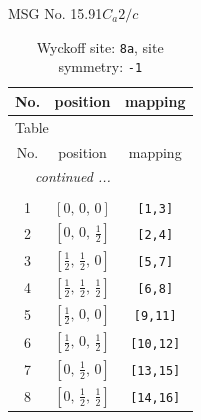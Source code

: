 \documentclass[fleqn,8pt]{jsarticle}
\begin{document}
\setcounter{MaxMatrixCols}{32}

\renewcommand{\tablename}{Table~}
\renewcommand{\figurename}{Figure~}
\begin{center}
\LARGE
MSG No. 15.91\quad$C_{a}2/c$
\end{center}
\renewcommand{\arraystretch}{1.2}
\begin{longtable}{ccc}
\caption{Wyckoff site: {\tt 8a}, site symmetry: {\tt -1}}
 \\
 \hline \hline
No. & position & mapping \\ \hline \endfirsthead

\multicolumn{2}{l}{\tablename\ \thetable{}} \\
 \hline \hline
No. & position & mapping \\ \hline \endhead

 \hline \hline
\multicolumn{2}{r}{\footnotesize\it continued ...} \\ \endfoot

 \hline \hline
\multicolumn{2}{r}{} \\ \endlastfoot

1 & $\left[ 0,\, 0,\, 0 \right]$ & {\tt [1,3]} \\ \hline
2 & $\left[ 0,\, 0,\, \frac{1}{2} \right]$ & {\tt [2,4]} \\ \hline
3 & $\left[ \frac{1}{2},\, \frac{1}{2},\, 0 \right]$ & {\tt [5,7]} \\ \hline
4 & $\left[ \frac{1}{2},\, \frac{1}{2},\, \frac{1}{2} \right]$ & {\tt [6,8]} \\ \hline
5 & $\left[ \frac{1}{2},\, 0,\, 0 \right]$ & {\tt [9,11]} \\ \hline
6 & $\left[ \frac{1}{2},\, 0,\, \frac{1}{2} \right]$ & {\tt [10,12]} \\ \hline
7 & $\left[ 0,\, \frac{1}{2},\, 0 \right]$ & {\tt [13,15]} \\ \hline
8 & $\left[ 0,\, \frac{1}{2},\, \frac{1}{2} \right]$ & {\tt [14,16]} \\
\end{longtable}
\renewcommand{\arraystretch}{1.2}
\end{document}
